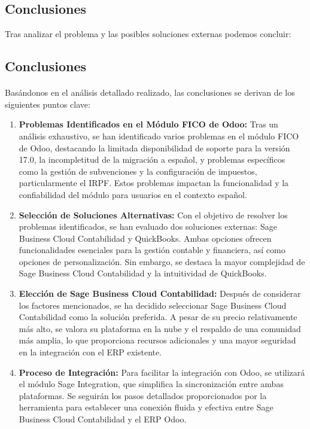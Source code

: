 \subsection{Conclusiones}
Tras analizar el problema y las posibles soluciones externas podemos concluir:
\subsection{Conclusiones}
\paragraph{}
Basándonos en el análisis detallado realizado, las conclusiones se derivan de los siguientes puntos clave:

\begin{enumerate}
    \item \textbf{Problemas Identificados en el Módulo FICO de Odoo:} Tras un análisis exhaustivo, se han identificado varios problemas en el módulo FICO de Odoo, destacando la limitada disponibilidad de soporte para la versión 17.0, la incompletitud de la migración a español, y problemas específicos como la gestión de subvenciones y la configuración de impuestos, particularmente el IRPF. Estos problemas impactan la funcionalidad y la confiabilidad del módulo para usuarios en el contexto español.
    
    \item \textbf{Selección de Soluciones Alternativas:} Con el objetivo de resolver los problemas identificados, se han evaluado dos soluciones externas: Sage Business Cloud Contabilidad y QuickBooks. Ambas opciones ofrecen funcionalidades esenciales para la gestión contable y financiera, así como opciones de personalización. Sin embargo, se destaca la mayor complejidad de Sage Business Cloud Contabilidad y la intuitividad de QuickBooks.
    
    \item \textbf{Elección de Sage Business Cloud Contabilidad:} Después de considerar los factores mencionados, se ha decidido seleccionar Sage Business Cloud Contabilidad como la solución preferida. A pesar de su precio relativamente más alto, se valora su plataforma en la nube y el respaldo de una comunidad más amplia, lo que proporciona recursos adicionales y una mayor seguridad en la integración con el ERP existente.
    
    \item \textbf{Proceso de Integración:} Para facilitar la integración con Odoo, se utilizará el módulo Sage Integration, que simplifica la sincronización entre ambas plataformas. Se seguirán los pasos detallados proporcionados por la herramienta para establecer una conexión fluida y efectiva entre Sage Business Cloud Contabilidad y el ERP Odoo.
\end{enumerate}
